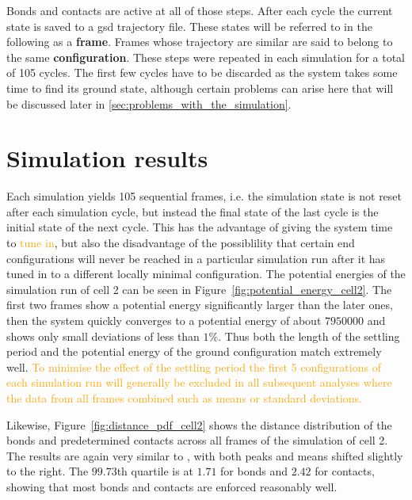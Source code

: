 Bonds and contacts are active at all of those steps. After each cycle the current state is saved to a gsd trajectory file. These states will be referred to in the following as a \textbf{frame}. Frames whose trajectory are similar are said to belong to the same \textbf{configuration}. These steps were repeated in each simulation for a total of 105 cycles. The first few cycles have to be discarded as the system takes some time to find its ground state, although certain problems can arise here that will be discussed later in \ref{sec:problems_with_the_simulation}.


\section{Simulation results} %
\label{sec:simulation_results}

Each simulation yields 105 sequential frames, i.e. the simulation state is not reset after each simulation cycle, but instead the final state of the last cycle is the initial state of the next cycle. This has the advantage of giving the system time to \textcolor{orange}{tune in}, but also the disadvantage of the possiblility that certain end configurations will never be reached in a particular simulation run after it has tuned in to a different locally minimal configuration. The potential energies of the simulation run of cell 2 can be seen in Figure~\ref{fig:potential_energy_cell2}. The first two frames show a potential energy significantly larger than the later ones, then the system quickly converges to a potential energy of about \(\num{7950000}\) and shows only small deviations of less than \(1 \%\). Thus both the length of the settling period and the potential energy of the ground configuration match \cite{wettermann_minimal_2020} extremely well. \textcolor{orange}{To minimise the effect of the settling period the first 5 configurations of each simulation run will generally be excluded in all subsequent analyses where the data from all frames combined such as means or standard deviations.}

Likewise, Figure~\ref{fig:distance_pdf_cell2} shows the distance distribution of the bonds and predetermined contacts across all frames of the simulation of cell 2. The results are again very similar to \cite{wettermann_minimal_2020}, with both peaks and means shifted slightly to the right. The \(99.73\)th quartile is at \(1.71\) for bonds and \(2.42\) for contacts, showing that most bonds and contacts are enforced reasonably well.

